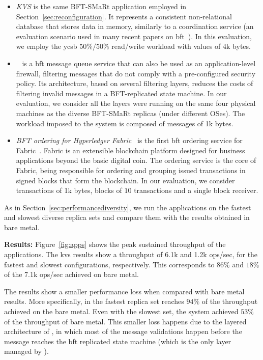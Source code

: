 \begin{itemize}

\item \emph{KVS} is the same BFT-SMaRt application employed in Section~\ref{sec:reconfiguration}.
It represents a consistent non-relational database that stores data in memory, similarly to a coordination service (an evaluation scenario used in many recent papers on \gls{bft}~\cite{Liu:2016,Behl:2017}).
In this evaluation, we employ the \gls{ycsb} $50\%/50\%$ read/write workload with values of 4k bytes.

\item \sieveq~\cite{Garcia:2016} is a \gls{bft} message queue service that can also be used as an application-level firewall, filtering messages that do not comply with a pre-configured security policy.
Its architecture, based on several filtering layers, reduces the costs of filtering invalid messages in a BFT-replicated state machine.
In our evaluation, we consider all the layers were running on the same four physical machines as the diverse BFT-SMaRt replicas (under different OSes).
The workload imposed to the system is composed of messages of 1k bytes.

\item \emph{BFT ordering for Hyperledger Fabric}~\cite{Sousa:2018} is the first \gls{bft} ordering service for Fabric~\cite{Androulaki:2018}. 
Fabric is an extensible blockchain platform designed for business applications beyond the basic digital coin.
The ordering service is the core of Fabric, being responsible for ordering and grouping issued transactions in signed blocks that form the blockchain.
In our evaluation, we consider transactions of 1k bytes, blocks of $10$ transactions and a single block receiver.

\end{itemize}

As in Section~\ref{sec:performancediversity}, we run the applications on the fastest and slowest diverse replica sets and compare them with the results obtained in bare metal.

\textbf{Results:}
Figure~\ref{fig:apps} shows the peak sustained throughput of the applications. 
The \gls{kvs} results show a throughput of 6.1k and 1.2k ops/sec, for the fastest and slowest configurations, respectively.
This corresponds to $86\%$ and $18\%$ of the 7.1k ops/sec achieved on bare metal.

The \sieveq results show a smaller performance loss when compared with bare metal results.
More specifically, \sieveq in the fastest replica set reaches $94\%$ of the throughput achieved on the bare metal.
Even with the slowest set, the system achieved $53\%$ of the throughput of bare metal.
This smaller loss happens due to the layered architecture of \sieveq, in which most of the message validations happen before the message reaches the \gls{bft} replicated state machine (which is the only layer managed by \system).

